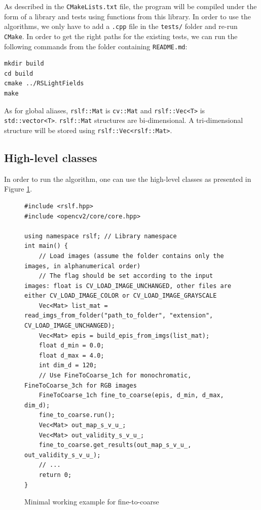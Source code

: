 \documentclass{article}
\theoremstyle{definition}
\begin{document}
As described in the \verb#CMakeLists.txt# file, the program will be compiled under the form of a library and tests using functions from this library. In order to use the algorithms, we only have to add a \verb#.cpp# file in the \verb#tests/# folder and re-run \verb#CMake#. In order to get the right paths for the existing tests, we can run the following commands from the folder containing \verb#README.md#:
\begin{verbatim}
mkdir build
cd build
cmake ../RSLightFields
make
\end{verbatim}


As for global aliases, \verb#rslf::Mat# is \verb#cv::Mat# and \verb#rslf::Vec<T># is \verb#std::vector<T>#. \verb#rslf::Mat# structures are bi-dimensional. A tri-dimensional structure will be stored using \verb#rslf::Vec<rslf::Mat>#.



\subsection{High-level classes}


In order to run the algorithm, one can use the high-level classes as presented in Figure \ref{code:mwe:ftc}.

\begin{figure}[ht]
\begin{lstlisting}
#include <rslf.hpp>
#include <opencv2/core/core.hpp>

using namespace rslf; // Library namespace
int main() {
    // Load images (assume the folder contains only the images, in alphanumerical order)
    // The flag should be set according to the input images: float is CV_LOAD_IMAGE_UNCHANGED, other files are either CV_LOAD_IMAGE_COLOR or CV_LOAD_IMAGE_GRAYSCALE
    Vec<Mat> list_mat = read_imgs_from_folder("path_to_folder", "extension", CV_LOAD_IMAGE_UNCHANGED); 
    Vec<Mat> epis = build_epis_from_imgs(list_mat);
    float d_min = 0.0;
    float d_max = 4.0;
    int dim_d = 120;
    // Use FineToCoarse_1ch for monochromatic, FineToCoarse_3ch for RGB images 
    FineToCoarse_1ch fine_to_coarse(epis, d_min, d_max, dim_d);
    fine_to_coarse.run();
    Vec<Mat> out_map_s_v_u_;
    Vec<Mat> out_validity_s_v_u_;
    fine_to_coarse.get_results(out_map_s_v_u_, out_validity_s_v_u_);
    // ...
    return 0;
}
\end{lstlisting}
\caption{Minimal working example for fine-to-coarse}
\label{code:mwe:ftc}
\end{figure}
\end{document}
